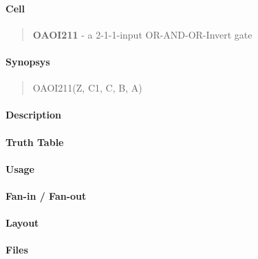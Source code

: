 \label{OAOI211}
\paragraph{Cell}
\begin{quote}
    \textbf{OAOI211} - a 2-1-1-input OR-AND-OR-Invert gate
\end{quote}

\paragraph{Synopsys}
\begin{quote}
    OAOI211(Z, C1, C, B, A)
\end{quote}

\paragraph{Description}

%

\paragraph{Truth Table}
%

\paragraph{Usage}

\paragraph{Fan-in / Fan-out}

\paragraph{Layout}

\paragraph{Files}

